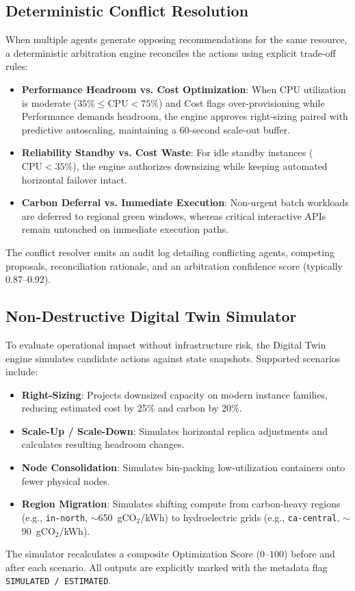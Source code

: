 \documentclass[conference]{IEEEtran}
\begin{document}
\subsection{Deterministic Conflict Resolution}
When multiple agents generate opposing recommendations for the same resource, a deterministic arbitration engine reconciles the actions using explicit trade-off rules:
\begin{itemize}
    \item \textbf{Performance Headroom vs. Cost Optimization}: When CPU utilization is moderate ($35\% \le \text{CPU} < 75\%$) and Cost flags over-provisioning while Performance demands headroom, the engine approves right-sizing paired with predictive autoscaling, maintaining a 60-second scale-out buffer.
    \item \textbf{Reliability Standby vs. Cost Waste}: For idle standby instances ($\text{CPU} < 35\%$), the engine authorizes downsizing while keeping automated horizontal failover intact.
    \item \textbf{Carbon Deferral vs. Immediate Execution}: Non-urgent batch workloads are deferred to regional green windows, whereas critical interactive APIs remain untouched on immediate execution paths.
\end{itemize}
The conflict resolver emits an audit log detailing conflicting agents, competing proposals, reconciliation rationale, and an arbitration confidence score (typically $0.87$--$0.92$).

\subsection{Non-Destructive Digital Twin Simulator}
To evaluate operational impact without infrastructure risk, the Digital Twin engine simulates candidate actions against state snapshots. Supported scenarios include:
\begin{itemize}
    \item \textbf{Right-Sizing}: Projects downsized capacity on modern instance families, reducing estimated cost by 25\% and carbon by 20\%.
    \item \textbf{Scale-Up / Scale-Down}: Simulates horizontal replica adjustments and calculates resulting headroom changes.
    \item \textbf{Node Consolidation}: Simulates bin-packing low-utilization containers onto fewer physical nodes.
    \item \textbf{Region Migration}: Simulates shifting compute from carbon-heavy regions (e.g., \texttt{in-north}, $\sim$650~gCO$_2$/kWh) to hydroelectric grids (e.g., \texttt{ca-central}, $\sim$90~gCO$_2$/kWh).
\end{itemize}
The simulator recalculates a composite Optimization Score ($0$--$100$) before and after each scenario. All outputs are explicitly marked with the metadata flag \texttt{SIMULATED / ESTIMATED}.
\end{document}
